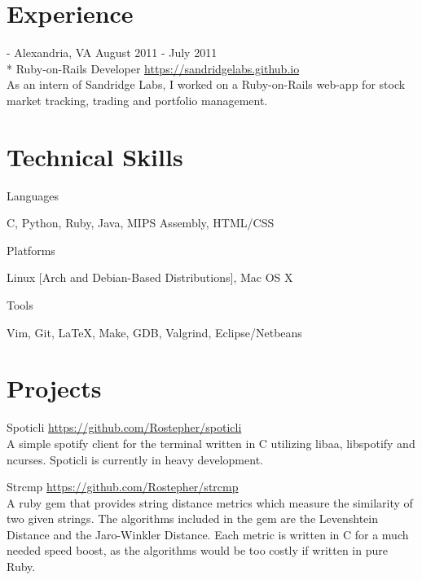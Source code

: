 \documentclass[letterpaper,margin,line,11pt]{resume}
\newcommand{\rurl}[1]{\hfill {\footnotesize \url{#1}}}
\newcommand{\rdate}[1]{\hfill {\small #1}}
\newcommand{\tab}[1]{\hspace{1em}}
\renewcommand{\employer}[5]{\item[#1] - #2 \rdate{#3} \\* #4 \rurl{#5}}
\begin{document}
\begin{resume}
\section{\mysidestyle Experience}
	\begin{asparadesc}
		\employer{Sandridge Labs}{Alexandria, VA}{August 2011 - July 2011}{Ruby-on-Rails Developer}{https://sandridgelabs.github.io}
        \vspace{1em}\\
		As an intern of Sandridge Labs, I worked on a Ruby-on-Rails web-app for stock market tracking, trading and portfolio management.
		\normalsize
	\end{asparadesc}

\section{\mysidestyle Technical Skills}
	\begin{compactdesc}
		\item[Languages]
			\item\tab{} C, Python, Ruby, Java, MIPS Assembly, HTML/CSS
			\vspace{1em}
		\item[Platforms]
			\item\tab{} Linux [Arch and Debian-Based Distributions], Mac OS X
			\vspace{1em}
		\item[Tools]
			\item\tab{} Vim, Git, \LaTeX, Make, GDB, Valgrind, Eclipse/Netbeans
	\end{compactdesc}

\section{\mysidestyle Projects}
	\begin{compactdesc}
		\item[Spoticli] \rurl{https://github.com/Rostepher/spoticli}
		\\
		A simple spotify client for the terminal written in C utilizing libaa, libspotify and ncurses. Spoticli is currently in heavy development.
		
		\vspace{1em}
		
		\item[Strcmp] \rurl{https://github.com/Rostepher/strcmp}
		\\
		A ruby gem that provides string distance metrics which measure the similarity of two given strings. The algorithms included in the gem are the Levenshtein Distance and the Jaro-Winkler Distance. Each metric is written in C for a much needed speed boost, as the algorithms would be too costly if written in pure Ruby.
	\end{compactdesc}


\end{resume}
\end{document}
